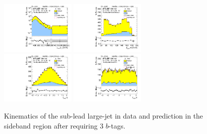 \begin{figure}[htbp!]
\begin{center}
\includegraphics[width=0.32\textwidth,angle=-90]{figures/boosted/Sideband/b77_ThreeTag_Sideband_sublHCand_Pt_m_1.pdf}
\includegraphics[width=0.32\textwidth,angle=-90]{figures/boosted/Sideband/b77_ThreeTag_Sideband_sublHCand_Mass_s.pdf}\\
\includegraphics[width=0.32\textwidth,angle=-90]{figures/boosted/Sideband/b77_ThreeTag_Sideband_sublHCand_Eta.pdf}
\includegraphics[width=0.32\textwidth,angle=-90]{figures/boosted/Sideband/b77_ThreeTag_Sideband_sublHCand_Phi.pdf}
  \caption{Kinematics of the sub-lead large-\R jet in data and prediction in the sideband region after requiring 3 $b$-tags.}
  \label{fig:boosted-3b-sideband-ak10-subl}
\end{center}
\end{figure}

